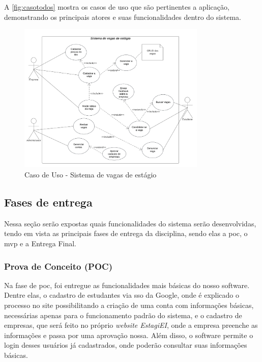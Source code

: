 A \autoref{fig:casotodos} mostra os casos de uso que são pertinentes a aplicação, demonstrando os principais atores e suas funcionalidades dentro do sistema.

\begin{figure}[H]
	\centering 
	\caption{\label{fig:casotodos}Caso de Uso - Sistema de vagas de estágio}
	\includegraphics[width=0.8\textwidth]{../imagens/caso-de-uso-todos.png} 
\end{figure}

\subsection{Fases de entrega}

Nessa seção serão expostas quais funcionalidades do sistema serão desenvolvidas, tendo em vista as principais fases de entrega da disciplina, sendo elas a \ac{poc}, o \ac{mvp} e a Entrega Final.

\subsubsection{Prova de Conceito (POC)}

Na fase de \ac{poc}, foi entregue as funcionalidades mais básicas do nosso software. Dentre elas, o cadastro de estudantes via \ac{sso} da Google, onde é explicado o processo no site possibilitando a criação de uma conta com informações básicas, necessárias apenas para o funcionamento padrão do sistema, e o cadastro de empresas, que será feito no próprio \emph{website EstagiEI}, onde a empresa preenche as informações e passa por uma aprovação nossa. Além disso, o software permite o login desses usuários já cadastrados, onde poderão consultar suas informações básicas.

